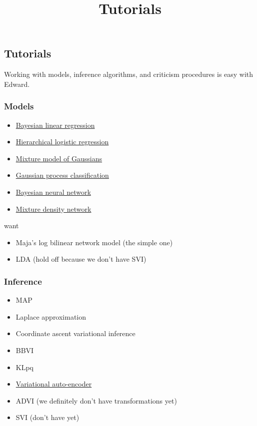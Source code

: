 \title{Tutorials}

\subsection{Tutorials}
Working with models, inference algorithms, and criticism procedures is easy with
Edward.

\subsubsection{Models}

\begin{itemize}
\item
  \href{https://github.com/blei-lab/edward/blob/master/examples/bayesian_linear_regression.py}{Bayesian
  linear regression}
\item
  \href{https://github.com/blei-lab/edward/blob/master/examples/hierarchical_logistic_regression.py}{Hierarchical
  logistic regression}
\item
  \href{https://github.com/blei-lab/edward/blob/master/examples/mixture_gaussian.py}{Mixture
  model of Gaussians}
\item
  \href{https://github.com/blei-lab/edward/blob/master/examples/gp_classification.py}{Gaussian
  process classification}
\item
  \href{https://github.com/blei-lab/edward/blob/master/examples/bayesian_nn.py}{Bayesian
  neural network}
\item
  \href{https://github.com/blei-lab/edward/blob/master/examples/mixture_density_network.py}{Mixture
  density network}
\end{itemize}

want

\begin{itemize}
  \item Maja's log bilinear network model (the simple one)
  \item LDA (hold off because we don't have SVI)
\end{itemize}

\subsubsection{Inference}

\begin{itemize}
  \item MAP
  \item Laplace approximation
  \item Coordinate ascent variational inference
  \item BBVI
  \item KLpq
  \item
  \href{https://github.com/blei-lab/edward/blob/master/examples/convolutional_vae.py}{Variational
  auto-encoder}
  \item ADVI (we definitely don't have transformations yet)
  \item SVI (don't have yet)
\end{itemize}

